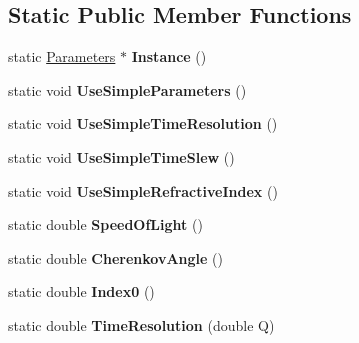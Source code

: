 \subsection*{Static Public Member Functions}
\begin{DoxyCompactItemize}
\item 
\hypertarget{classParameters_a116c287173521b39aaef6d9ae2f1168f}{
static \hyperlink{classParameters}{Parameters} $\ast$ {\bfseries Instance} ()}
\label{classParameters_a116c287173521b39aaef6d9ae2f1168f}

\item 
\hypertarget{classParameters_aceaf40bdd65a08ebfa507ae05f1a7633}{
static void {\bfseries UseSimpleParameters} ()}
\label{classParameters_aceaf40bdd65a08ebfa507ae05f1a7633}

\item 
\hypertarget{classParameters_aa0d5f324fe5c3e1418ece481c11bc3eb}{
static void {\bfseries UseSimpleTimeResolution} ()}
\label{classParameters_aa0d5f324fe5c3e1418ece481c11bc3eb}

\item 
\hypertarget{classParameters_a3c61940ae61811d6ca29490978a2a62b}{
static void {\bfseries UseSimpleTimeSlew} ()}
\label{classParameters_a3c61940ae61811d6ca29490978a2a62b}

\item 
\hypertarget{classParameters_a9a9a5eeb5df6d4e60fd9b530fc423aa5}{
static void {\bfseries UseSimpleRefractiveIndex} ()}
\label{classParameters_a9a9a5eeb5df6d4e60fd9b530fc423aa5}

\item 
\hypertarget{classParameters_acc1d5f6429ddb3ab5bd8b0573f049f19}{
static double {\bfseries SpeedOfLight} ()}
\label{classParameters_acc1d5f6429ddb3ab5bd8b0573f049f19}

\item 
\hypertarget{classParameters_a0f0992984d8940acce2ad65a4e5be0b4}{
static double {\bfseries CherenkovAngle} ()}
\label{classParameters_a0f0992984d8940acce2ad65a4e5be0b4}

\item 
\hypertarget{classParameters_a31bf30badb89527522d36cd509a44ec3}{
static double {\bfseries Index0} ()}
\label{classParameters_a31bf30badb89527522d36cd509a44ec3}

\item 
\hypertarget{classParameters_ad26c530d23bc0f13afb8ed08c060fe13}{
static double {\bfseries TimeResolution} (double Q)}
\label{classParameters_ad26c530d23bc0f13afb8ed08c060fe13}


\end{DoxyCompactItemize}
